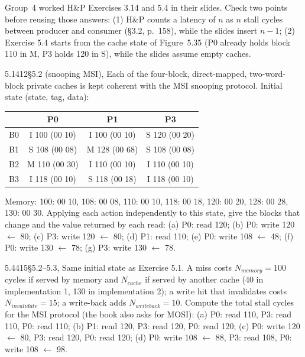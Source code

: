 \begin{remark}
Group~4 worked H\&P Exercises 3.14 and 5.4 in their slides. Check two points before
reusing those answers: (1) H\&P counts a latency of $n$ as $n$ stall cycles between
producer and consumer (\S3.2, p.~158), while the slides insert $n-1$; (2) Exercise
5.4 starts from the cache state of Figure~5.35 (P0 already holds block 110 in M,
P3 holds 120 in S), while the slides assume empty caches.
\end{remark}

\begin{tbexercise}{5.1}{412}{\S5.2 (snooping MSI), }
Each of the four-block, direct-mapped, two-word-block private caches is kept
coherent with the MSI snooping protocol. Initial state (state, tag, data):
\begin{center}
\scriptsize
\begin{tabular}{@{}lccc@{}}
\toprule
& P0 & P1 & P3 \\
\midrule
B0 & I 100 (00 10) & I 100 (00 10) & S 120 (00 20) \\
B1 & S 108 (00 08) & M 128 (00 68) & S 108 (00 08) \\
B2 & M 110 (00 30) & I 110 (00 10) & I 110 (00 10) \\
B3 & I 118 (00 10) & S 118 (00 18) & I 118 (00 10) \\
\bottomrule
\end{tabular}
\end{center}
Memory: 100: 00 10, 108: 00 08, 110: 00 10, 118: 00 18, 120: 00 20, 128: 00 28,
130: 00 30. Applying each action independently to this state, give the blocks that
change and the value returned by each read: (a) P0: read 120; (b) P0: write 120
$\leftarrow$ 80; (c) P3: write 120 $\leftarrow$ 80; (d) P1: read 110; (e) P0: write
108 $\leftarrow$ 48; (f) P0: write 130 $\leftarrow$ 78; (g) P3: write 130 $\leftarrow$ 78.
\end{tbexercise}

\begin{tbexercise}{5.4}{415}{\S5.2--5.3, }
Same initial state as Exercise 5.1. A miss costs $N_{memory}=100$ cycles if served by
memory and $N_{cache}$ if served by another cache (40 in implementation 1, 130 in
implementation 2); a write hit that invalidates costs $N_{invalidate}=15$; a
write-back adds $N_{writeback}=10$. Compute the total stall cycles for the MSI
protocol (the book also asks for MOSI): (a) P0: read 110, P3: read 110, P0: read
110; (b) P1: read 120, P3: read 120, P0: read 120; (c) P0: write 120 $\leftarrow$ 80,
P3: read 120, P0: read 120; (d) P0: write 108 $\leftarrow$ 88, P3: read 108, P0: write
108 $\leftarrow$ 98.
\end{tbexercise}

